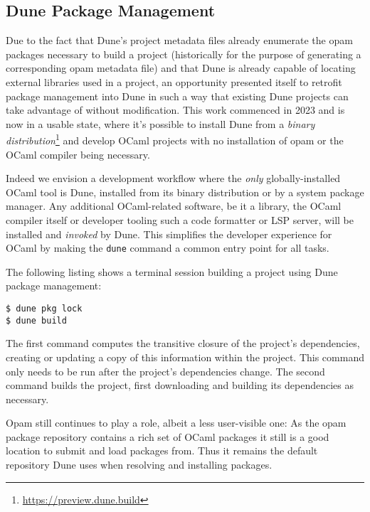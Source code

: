 \documentclass{article}
\begin{document}
\begin{multicols}{2}
        \section {Dune Package Management}

        Due to the fact that Dune's project metadata files already enumerate
        the opam packages necessary to build a project (historically for the
        purpose of generating a corresponding opam metadata file) and that Dune
        is already capable of locating external libraries used in a project, an
        opportunity presented itself to retrofit package management into Dune in
        such a way that existing Dune projects can take advantage of without
        modification. This work commenced in 2023 and is now in a usable state,
        where it's possible to install Dune from a \textit{binary
        distribution}\footnote{\url{https://preview.dune.build}} and develop OCaml
        projects with no installation of opam or the OCaml compiler being
        necessary.

        Indeed we envision a development workflow where the \textit{only}
        globally-installed OCaml tool is Dune, installed from its binary
        distribution or by a system package manager. Any additional
        OCaml-related software, be it a library, the OCaml compiler itself or
        developer tooling such a code formatter or LSP server, will be installed
        and \textit{invoked} by Dune. This simplifies the developer experience
        for OCaml by making the \texttt{dune} command a common entry point for all
        tasks.

        The following listing shows a terminal session building a project using
        Dune package management:
        \begin{lstlisting}
$ dune pkg lock
$ dune build
        \end{lstlisting}

        The first command computes the transitive closure of the project's
        dependencies, creating or updating a copy of this information within the
        project. This command only needs to be run after the project's
        dependencies change. The second command builds the project, first
        downloading and building its dependencies as necessary.

        Opam still continues to play a role, albeit a less user-visible one: As
        the opam package repository contains a rich set of OCaml packages it
        still is a good location to submit and load packages from. Thus it
        remains the default repository Dune uses when resolving and installing
        packages.


\end{multicols}
\end{document}

